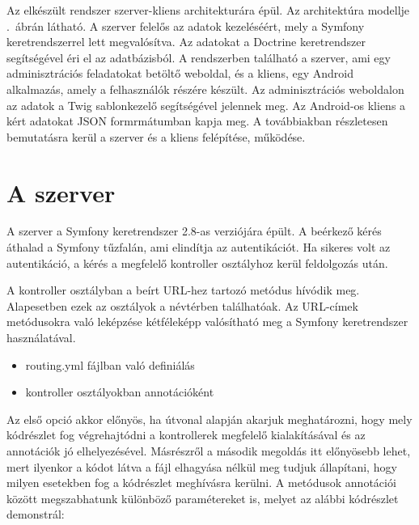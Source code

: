 Az elkészült rendszer szerver-kliens architekturára épül.
Az architektúra modellje .\ ábrán látható. 
A szerver felelős az adatok kezeléséért, mely a Symfony keretrendszerrel lett megvalósítva. 
Az adatokat a Doctrine keretrendszer segítségével éri el az adatbázisból. 
A rendszerben található a szerver, ami egy adminisztrációs feladatokat betöltő weboldal, és a kliens, egy Android alkalmazás, amely a felhasználók részére készült. 
Az adminisztrációs weboldalon az adatok a Twig sablonkezelő segítségével jelennek meg. 
Az Android-os kliens a kért adatokat JSON formrmátumban kapja meg. 
A továbbiakban részletesen bemutatásra kerül a szerver és a kliens felépítése, működése. 


\section{A szerver}
\label{szerverfelepites}

A szerver a Symfony keretrendszer 2.8-as verziójára épült. 
A beérkező kérés áthalad a Symfony tűzfalán, ami elindítja az autentikációt. 
Ha sikeres volt az autentikáció, a kérés a megfelelő kontroller osztályhoz kerül feldolgozás után. 


A kontroller osztályban a beírt URL-hez tartozó metódus hívódik meg. 
Alapesetben ezek az osztályok a  névtérben találhatóak. 
Az URL-címek metódusokra való leképzése kétféleképp valósítható meg a Symfony keretrendszer használatával. 

\begin{itemize}
	\item routing.yml fájlban való definiálás
	\item kontroller osztályokban annotációként
\end{itemize}

Az első opció akkor előnyös, ha útvonal alapján akarjuk meghatározni, hogy mely kódrészlet fog végrehajtódni a kontrollerek megfelelő kialakításával és az annotációk jó elhelyezésével. 
Másrészről a második megoldás itt előnyösebb lehet, mert ilyenkor a kódot látva a fájl elhagyása nélkül meg tudjuk állapítani, hogy milyen esetekben fog a kódrészlet meghívásra kerülni. 
A metódusok annotációi között megszabhatunk különböző paramétereket is, melyet az alábbi kódrészlet demonstrál:


